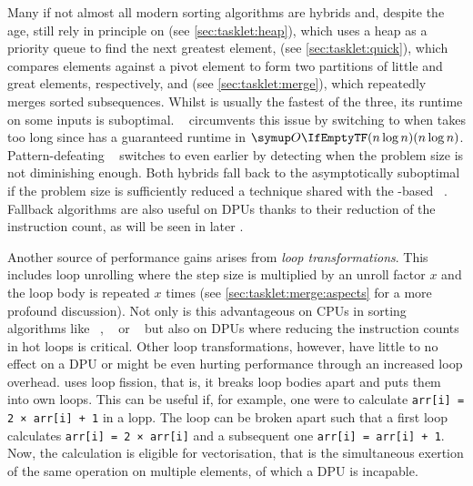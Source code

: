 Many if not almost all modern sorting algorithms are hybrids and, despite the age, still rely in principle on \emph{\HS{}} (see \cref{sec:tasklet:heap}), which uses a heap as a priority queue to find the next greatest element, \emph{\QS{}} (see \cref{sec:tasklet:quick}), which compares elements against a pivot element to form two partitions of little and great elements, respectively, and \emph{\MS{}} (see \cref{sec:tasklet:merge}), which repeatedly merges sorted subsequences.
Whilst \QS{} is usually the fastest of the three, its runtime on some inputs is suboptimal.
\IntroS{}~\cite{musser1999introspective} circumvents this issue by switching to \HS{} when \QS{} takes too long since \HS{} has a guaranteed runtime in \(\bigoh{n \log n}\).
Pattern-defeating \QS{}~\cite{peters2021patterndefeatingquicksort} switches to \HS{} even earlier by detecting when the problem size is not diminishing enough.
Both hybrids fall back to the asymptotically suboptimal \IS{} if the problem size is sufficiently reduced \Dash a technique shared with the \MS{}-based \TS{}~\cite{peters2002timsort}.
Fallback algorithms are also useful on \acp{DPU} thanks to their reduction of the instruction count, as will be seen in later .

Another source of performance gains arises from \emph{loop transformations}.
This includes loop unrolling where the step size is multiplied by an unroll factor \(x\) and the loop body is repeated \(x\) times (see \cref{sec:tasklet:merge:aspects} for a more profound discussion).
Not only is this advantageous on \acp{CPU} in sorting algorithms like \IPSo{}~\cite{axtmann2020engineering}, \SSSSS{}~\cite{bingmann2015engineering} or \SkaS{}~\cite{skarupke2016ska} but also on \acp{DPU} where reducing the instruction counts in hot loops is critical.
Other loop transformations, however, have little to no effect on a \ac{DPU} or might be even hurting performance through an increased loop overhead.
\SSSSS{} uses loop fission, that is, it breaks loop bodies apart and puts them into own loops.
This can be useful if, for example, one were to calculate \lstinline|arr[i] = 2 × arr[i] + 1| in a lopp.
The loop can be broken apart such that a first loop calculates \lstinline|arr[i] = 2 × arr[i]| and a subsequent one \lstinline|arr[i] = arr[i] + 1|.
Now, the calculation is eligible for vectorisation, that is the simultaneous exertion of the same operation on multiple elements, of which a \ac{DPU} is incapable.

